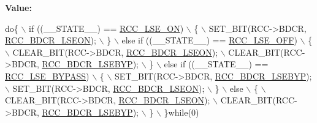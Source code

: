 {\bfseries Value\+:}
\begin{DoxyCode}
\textcolor{keywordflow}{do}\{                                                     \(\backslash\)
                      if ((\_\_STATE\_\_) == \hyperlink{group___r_c_c___l_s_e___config_gac981ea636c2f215e4473901e0912f55a}{RCC\_LSE\_ON})                        \(\backslash\)
                      \{                                                     \(\backslash\)
                        SET\_BIT(RCC->BDCR, \hyperlink{group___peripheral___registers___bits___definition_ga00145f8814cb9a5b180d76499d97aead}{RCC\_BDCR\_LSEON});                   \(\backslash\)
                      \}                                                     \(\backslash\)
                      else \textcolor{keywordflow}{if} ((\_\_STATE\_\_) == \hyperlink{group___r_c_c___l_s_e___config_ga6645c27708d0cad1a4ab61d2abb24c77}{RCC\_LSE\_OFF})                  \(\backslash\)
                      \{                                                     \(\backslash\)
                        CLEAR\_BIT(RCC->BDCR, \hyperlink{group___peripheral___registers___bits___definition_ga00145f8814cb9a5b180d76499d97aead}{RCC\_BDCR\_LSEON});                 \(\backslash\)
                        CLEAR\_BIT(RCC->BDCR, \hyperlink{group___peripheral___registers___bits___definition_ga542dffd7f8dc4da5401b54d822a22af0}{RCC\_BDCR\_LSEBYP});                \(\backslash\)
                      \}                                                     \(\backslash\)
                      else \textcolor{keywordflow}{if} ((\_\_STATE\_\_) == \hyperlink{group___r_c_c___l_s_e___config_gaad580157edbae878edbcc83c5a68e767}{RCC\_LSE\_BYPASS})               \(\backslash\)
                      \{                                                     \(\backslash\)
                        SET\_BIT(RCC->BDCR, \hyperlink{group___peripheral___registers___bits___definition_ga542dffd7f8dc4da5401b54d822a22af0}{RCC\_BDCR\_LSEBYP});                  \(\backslash\)
                        SET\_BIT(RCC->BDCR, \hyperlink{group___peripheral___registers___bits___definition_ga00145f8814cb9a5b180d76499d97aead}{RCC\_BDCR\_LSEON});                   \(\backslash\)
                      \}                                                     \(\backslash\)
                      else                                                  \(\backslash\)
                      \{                                                     \(\backslash\)
                        CLEAR\_BIT(RCC->BDCR, \hyperlink{group___peripheral___registers___bits___definition_ga00145f8814cb9a5b180d76499d97aead}{RCC\_BDCR\_LSEON});                 \(\backslash\)
                        CLEAR\_BIT(RCC->BDCR, \hyperlink{group___peripheral___registers___bits___definition_ga542dffd7f8dc4da5401b54d822a22af0}{RCC\_BDCR\_LSEBYP});                \(\backslash\)
                      \}                                                     \(\backslash\)
                    \}\textcolor{keywordflow}{while}(0)
\end{DoxyCode}


